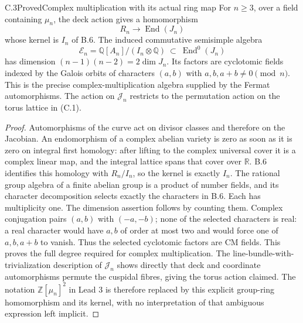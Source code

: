 \begin{statement}{C.3}{Proved}{Complex multiplication with its actual ring map}
For \(n\ge3\), over a field containing \(\mu_n\), the deck action gives a homomorphism
\[
 R_n\longrightarrow\operatorname{End}(J_n)
\]
whose kernel is \(I_n\) of B.6. The induced commutative semisimple
algebra
\[
 \mathcal E_n=\mathbb Q[A_n]/(I_n\otimes\mathbb Q)
 \ \subset\ \operatorname{End}^0(J_n)
\]
has dimension \((n-1)(n-2)=2\dim J_n\). Its factors are cyclotomic
fields indexed by the Galois orbits of characters
\((a,b)\) with \(a,b,a+b\ne0\pmod n\). This is the precise
complex-multiplication algebra supplied by the Fermat automorphisms.
The action on \(\mathcal J_n\) restricts to the permutation action
on the torus lattice in (C.1).
\end{statement}
\begin{proof}
Automorphisms of the curve act on divisor classes and therefore on
the Jacobian. An endomorphism of a complex abelian variety is zero
as soon as it is zero on integral first homology: after lifting to
the complex universal cover it is a complex linear map, and the
integral lattice spans that cover over \(\mathbb R\).
B.6 identifies this homology with \(R_n/I_n\), so the kernel is
exactly \(I_n\). The rational group algebra of a finite abelian
group is a product of number fields, and its character
decomposition selects exactly the characters in B.6. Each has
multiplicity one. The dimension assertion follows by counting them.
Complex conjugation pairs \((a,b)\) with \((-a,-b)\);
none of the selected characters is real: a real character would
have \(a,b\) of order at most two and would force one of
\(a,b,a+b\) to vanish. Thus the selected cyclotomic factors are
CM fields. This proves the full degree required for complex
multiplication.
The line-bundle-with-trivialization description of \(\mathcal J_n\)
shows directly that deck and coordinate automorphisms permute the
cuspidal fibres, giving the torus action claimed. The notation
\(\mathbb Z[\mu_n]^2\) in Lead 3 is therefore replaced by this
explicit group-ring homomorphism and its kernel, with no
interpretation of that ambiguous expression left implicit.
\end{proof}

